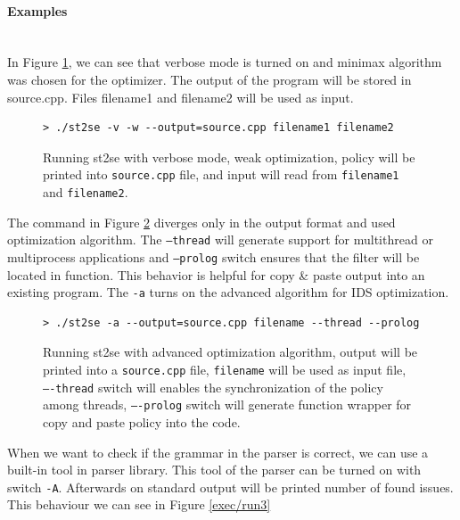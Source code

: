 \paragraph{Examples} \hspace{0pt} \\

In Figure \ref{exec/run1}, we can see that verbose mode is turned on and minimax
algorithm was chosen for the optimizer. The output of the program will be stored
in source.cpp. Files filename1 and filename2 will be used as input.

\begin{figure}[H]
	\lstset{style=npl}
\begin{lstlisting}
> ./st2se -v -w --output=source.cpp filename1 filename2
\end{lstlisting}
	\caption{Running st2se with verbose mode, weak optimization, policy
	will be printed into \texttt{source.cpp} file, and input will read from
	\texttt{filename1} and \texttt{filename2}.}
	\label{exec/run1}
\end{figure}

The command in Figure \ref{exec/run2} diverges only in the output format and
used optimization algorithm. The \texttt{--thread} will generate support for
multithread or multiprocess applications and \texttt{--prolog} switch ensures
that the filter will be located in function. This behavior is helpful for copy \&
paste output into an existing program. The \texttt{-a} turns on the advanced
algorithm for IDS optimization.

\begin{figure}[H]
	\lstset{style=npl}
\begin{lstlisting}
> ./st2se -a --output=source.cpp filename --thread --prolog
\end{lstlisting}
	\caption{Running st2se with advanced optimization algorithm, output will be
	printed into a \texttt{source.cpp} file, \texttt{filename} will be used as
	input file, \texttt{----thread} switch will enables the synchronization of
	the policy 	among threads, \texttt{----prolog} switch will generate function
	wrapper for copy and paste policy into the code.}
	\label{exec/run2}
\end{figure}

When we want to check if the grammar in the parser is correct, we can use a
built-in tool in parser library. This tool of the parser can be turned on with
switch \texttt{-A}. Afterwards on standard output will be printed number of
found issues. This behaviour we can see in Figure \ref{exec/run3}

